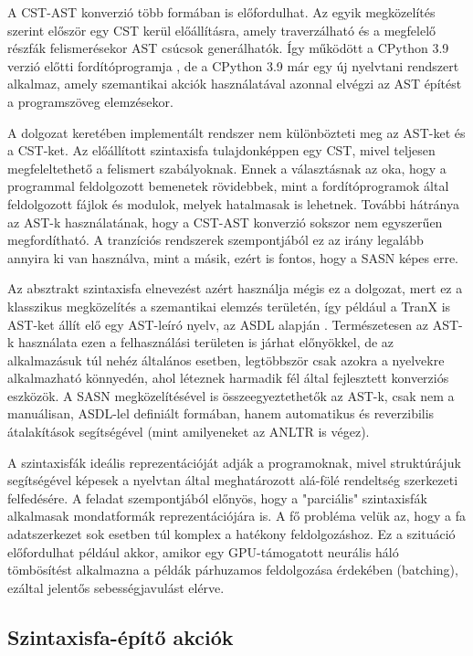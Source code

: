 \documentclass[twoside, 12pt]{report}
\begin{document}
A CST-AST konverzió több formában is előfordulhat. Az egyik megközelítés szerint először egy CST kerül előállításra, amely traverzálható és a megfelelő részfák felismerésekor AST csúcsok generálhatók. Így működött a CPython 3.9 verzió előtti fordítóprogramja \parencite{PSF20b}, de a CPython 3.9 már egy új nyelvtani rendszert \parencite{RGN20a} alkalmaz, amely szemantikai akciók használatával azonnal elvégzi az AST építést a programszöveg elemzésekor.

A dolgozat keretében implementált rendszer nem különbözteti meg az AST-ket és a CST-ket. Az előállított szintaxisfa tulajdonképpen egy CST, mivel teljesen megfeleltethető a felismert szabályoknak. Ennek a választásnak az oka, hogy a programmal feldolgozott bemenetek rövidebbek, mint a fordítóprogramok által feldolgozott fájlok és modulok, melyek hatalmasak is lehetnek. További hátránya az AST-k használatának, hogy a CST-AST konverzió sokszor nem egyszerűen megfordítható. A tranzíciós rendszerek szempontjából ez az irány legalább annyira ki van használva, mint a másik, ezért is fontos, hogy a SASN képes erre.

Az absztrakt szintaxisfa elnevezést azért használja mégis ez a dolgozat, mert ez a klasszikus megközelítés a szemantikai elemzés területén, így például a TranX is AST-ket állít elő egy AST-leíró nyelv, az ASDL alapján \parencite{Wan+97a}. Természetesen az AST-k használata ezen a felhasználási területen is járhat előnyökkel, de az alkalmazásuk túl nehéz általános esetben, legtöbbször csak azokra a nyelvekre alkalmazható könnyedén, ahol léteznek harmadik fél által fejlesztett konverziós eszközök. A SASN megközelítésével is összeegyeztethetők az AST-k, csak nem a manuálisan, ASDL-lel definiált formában, hanem automatikus és reverzibilis átalakítások segítségével (mint amilyeneket az ANLTR is végez).

A szintaxisfák ideális reprezentációját adják a programoknak, mivel struktúrájuk segítségével képesek a nyelvtan által meghatározott alá-fölé rendeltség szerkezeti felfedésére. A feladat szempontjából előnyös, hogy a "parciális" szintaxisfák alkalmasak mondatformák reprezentációjára is. A fő probléma velük az, hogy a fa adatszerkezet sok esetben túl komplex a hatékony feldolgozáshoz. Ez a szituáció előfordulhat például akkor, amikor egy GPU-támogatott neurális háló tömbösítést alkalmazna a példák párhuzamos feldolgozása érdekében (batching), ezáltal jelentős sebességjavulást elérve.

\subsection{Szintaxisfa-építő akciók}
\end{document}
